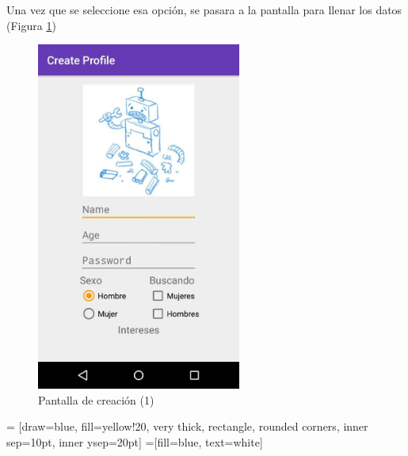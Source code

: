 \documentclass[10pt,letterpaper,extrafontsizes]{memoir}
\begin{document}
Una vez que se seleccione esa opción, se pasara a la pantalla para llenar los datos (Figura \ref{fig:createppagl1}) 

\begin{figure}[H]
    \centering
\includegraphics[width=0.6\textwidth]{graficos/capturas/i}
    \caption{Pantalla de creación (1)}
    \label{fig:createppagl1}
\end{figure}

\begin{center}
 = [draw=blue, fill=yellow!20, very thick,
    rectangle, rounded corners, inner sep=10pt, inner ysep=20pt]
 =[fill=blue, text=white]
\end{center}
%
\end{document}
